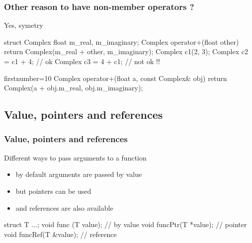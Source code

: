 \begin{frame}[fragile]
  \frametitle{Other reason to have non-member operators ?}
  \begin{block}{Yes, symetry}
  \end{block}
  \begin{cppcode}
    struct Complex {
      float m_real, m_imaginary;
      Complex operator+(float other) {
        return Complex(m_real + other, m_imaginary);
      }
    }
    Complex c1(2, 3);
    Complex c2 = c1 + 4;  // ok
    Complex c3 = 4 + c1;  // not ok !!
  \end{cppcode}
  \pause
  \begin{cppcode*}{firstnumber=10}
    Complex operator+(float a, const Complex& obj) {
      return Complex(a + obj.m_real, obj.m_imaginary);
    }
  \end{cppcode*}
\end{frame}

\subsection[Refs]{Value, pointers and references}

\begin{frame}[fragile]
  \frametitle{Value, pointers and references}
  \begin{block}{Different ways to pass arguments to a function}
    \begin{itemize}
    \item by default arguments are passed by value
    \item but pointers can be used
    \item and references are also available
    \end{itemize}
  \end{block}
  \begin{cppcode}
    struct T {...};
    void func   (T value);  // by value
    void funcPtr(T *value); // pointer
    void funcRef(T &value); // reference
  \end{cppcode}
\end{frame}

